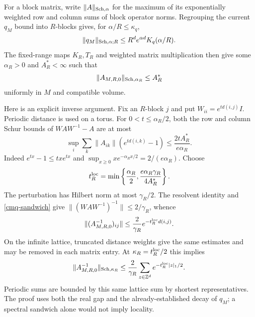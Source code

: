 For a block matrix, write $\|A\|_{{\rm Sch},\alpha}$ for the
maximum of its exponentially weighted row and column sums of
block operator norms. Regrouping the current $q_M$ bound into
$R$-blocks gives, for $\alpha/R\leq\kappa_q$,
\begin{equation}
 \|q_M\|_{{\rm Sch},\alpha;R}
 \leq R^d e^{\alpha d} K_q(\alpha/R).
 \label{cmq-regroup}
\end{equation}
The fixed-range maps $K_R,T_R$ and weighted matrix
multiplication then give some $\alpha_R>0$ and $A_R^*<\infty$
such that
\begin{equation}
 \|A_{M,R,0}\|_{{\rm Sch},\alpha_R}\leq A_R^*
 \label{cmq-precision-schur}
\end{equation}
uniformly in $M$ and compatible volume.

Here is an explicit inverse argument. Fix an $R$-block $j$ and
put $W_{ii}=e^{t d(i,j)}I$. Periodic distance is used on a torus.
For $0<t\leq\alpha_R/2$, both the row and column Schur bounds
of $WAW^{-1}-A$ are at most
\begin{equation}
 \sup_i\sum_k\|A_{ik}\|(e^{t d(i,k)}-1)
 \leq\frac{2tA_R^*}{e\alpha_R}.
 \label{cmq-conjugation}
\end{equation}
Indeed $e^{tx}-1\leq txe^{tx}$ and
$\sup_{x\geq0}xe^{-\alpha_Rx/2}=2/(e\alpha_R)$.
Choose
\begin{equation}
 t_R^{\rm loc}
 =\min\left\{\frac{\alpha_R}{2},
                  \frac{e\alpha_R\gamma_R}{4A_R^*}\right\}.
 \label{cmq-rate}
\end{equation}
The perturbation has Hilbert norm at most $\gamma_R/2$.
The resolvent identity and \eqref{cmq-sandwich} give
$\|(WAW^{-1})^{-1}\|\leq2/\gamma_R$, whence
\begin{equation}
 \|(A_{M,R,0}^{-1})_{ij}\|
 \leq\frac2{\gamma_R}e^{-t_R^{\rm loc}d(i,j)}.
 \label{cmq-entry-decay}
\end{equation}
On the infinite lattice, truncated distance weights give the
same estimates and may be removed in each matrix entry. At
$\kappa_R=t_R^{\rm loc}/2$ this implies
\begin{equation}
 \|A_{M,R,0}^{-1}\|_{{\rm Sch},\kappa_R}
 \leq\frac2{\gamma_R}
       \sum_{z\in\mathbb Z^d}e^{-t_R^{\rm loc}|z|_1/2}.
 \label{cmq-covariance-schur}
\end{equation}
Periodic sums are bounded by this same lattice sum by shortest
representatives. The proof uses both the real gap and the
already-established decay of $q_M$; a spectral sandwich alone
would not imply locality.

